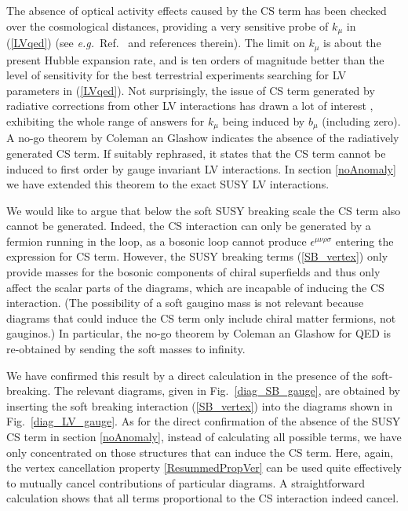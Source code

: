 \documentclass[12pt]{revtex4}
\begin{document}
 
The absence of optical activity effects caused by the CS term has been
checked over the cosmological distances, providing 
a very sensitive probe of $k_\mu$ in (\ref{LVqed}) (see {\em e.g.}\ 
Ref.~\cite{CFJ} and references therein). The limit on $k_\mu$ is about
the present Hubble expansion rate, and is ten orders of magnitude
better than the level of sensitivity for the best terrestrial
experiments searching for LV parameters in (\ref{LVqed}). Not
surprisingly, the issue of CS term generated by radiative corrections
from other LV interactions has drawn a lot of interest
\cite{CG,Jackiw:1999yp,Chung:1998jv,Andrianov:2001zj}, exhibiting the
whole range of answers for $k_\mu$ being induced by $b_\mu$ (including
zero). A no-go theorem by Coleman an Glashow \cite{CG}
indicates the absence of the radiatively generated CS
term. If suitably rephrased, it states that the CS term
cannot be induced to first order by gauge invariant LV interactions. 
In section \ref{noAnomaly} we have extended this theorem to the exact
SUSY LV interactions. 


We would like to argue that below the soft SUSY breaking scale the CS term also 
cannot be generated. Indeed, the CS interaction can only be generated
by a fermion running in the loop, as a bosonic loop cannot produce 
$ \epsilon^{\mu\nu\rho\sigma} $ entering the expression for CS term. 
However, the SUSY breaking terms (\ref{SB_vertex}) only 
provide masses for the bosonic components of chiral superfields
and thus only affect the scalar parts of the diagrams, which are 
incapable of inducing the CS interaction. (The possibility of a
soft gaugino mass is not relevant because diagrams that could induce
the CS term only include chiral matter fermions, not gauginos.) 
In particular, the no-go theorem by Coleman an Glashow \cite{CG} for
QED is re-obtained by sending the soft masses to infinity. 


We have confirmed this result by a direct calculation in the presence of
the soft-breaking. The relevant diagrams, given in
Fig.~\ref{diag_SB_gauge}, are obtained by inserting the soft breaking
interaction (\ref{SB_vertex}) into the diagrams shown in
Fig.~\ref{diag_LV_gauge}. As for the direct confirmation of the
absence of the SUSY CS term in section \ref{noAnomaly}, instead of
calculating all possible terms, we have only concentrated on those
structures that can induce the CS term. Here, again, the vertex
cancellation property \eqref{ResummedPropVer} can be used quite
effectively to mutually cancel contributions of particular diagrams.
A straightforward calculation shows that all terms proportional to the
CS interaction indeed cancel. 
\end{document}
